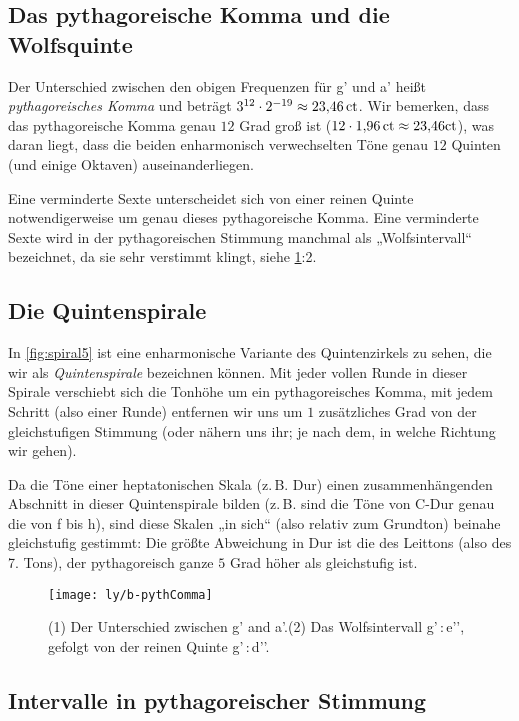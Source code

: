 \subsection{Das pythagoreische Komma und die Wolfsquinte}

Der Unterschied zwischen den obigen Frequenzen für \sharp g’ und \flat a’ heißt
\emph{pythagoreisches Komma} und beträgt
$3^{12}\cdot 2^{-19}\approx 23{,}46\,\text{ct}$. Wir bemerken, dass das
pythagoreische Komma genau $12$ Grad groß ist
($12\cdot 1{,}96\,\mathrm{ct}\approx 23{,}46\mathrm{ct}$), was daran liegt, dass die
beiden enharmonisch verwechselten Töne genau $12$ Quinten (und einige Oktaven)
auseinanderliegen.

Eine verminderte Sexte unterscheidet sich von einer reinen Quinte
notwendigerweise um genau dieses pythagoreische Komma. Eine verminderte Sexte
wird in der pythagoreischen Stimmung manchmal als „Wolfsintervall“ bezeichnet,
da sie sehr verstimmt klingt, siehe \cref{fig:pythComma}:2.

\subsection{Die Quintenspirale}

In \cref{fig:spiral5} ist eine enharmonische Variante des Quintenzirkels zu
sehen, die wir als \emph{Quintenspirale} bezeichnen können. Mit jeder vollen
Runde in dieser Spirale verschiebt sich die Tonhöhe um ein pythagoreisches
Komma, mit jedem Schritt (also  einer Runde) entfernen wir uns um
$1$ zusätzliches Grad von der gleichstufigen Stimmung (oder nähern uns ihr; je
nach dem, in welche Richtung wir gehen).

Da die Töne einer heptatonischen Skala (z.\,B. Dur) einen zusammenhängenden
Abschnitt in dieser Quintenspirale bilden (z.\,B. sind die Töne von C-Dur genau
die von f bis h), sind diese Skalen „in sich“ (also relativ zum Grundton)
beinahe gleichstufig gestimmt: Die größte Abweichung in Dur ist die des Leittons
(also des 7. Tons), der pythagoreisch ganze $5$ Grad höher als gleichstufig ist.

\begin{figure}[h]
  \centering
  \texttt{[image: ly/b-pythComma]}
  \caption{(1) Der Unterschied zwischen \sharp g’ and \flat a’.\quad (2) Das
    Wolfsintervall \sharp g’\,:\,\flat e’’, gefolgt von der reinen Quinte \sharp
    g’\,:\,\sharp d’’.}\label{fig:pythComma}
\end{figure}

\subsection{Intervalle in pythagoreischer Stimmung}
\label{sec:pythInt}

